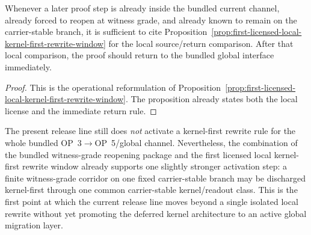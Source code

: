 \begin{corollary}
\label{cor:use-rule-for-the-first-local-kernel-first-rewrite-window}
Whenever a later proof step is already inside the bundled current channel, already forced to reopen at witness grade, and already known to remain on the carrier-stable branch, it is sufficient to cite Proposition~\ref{prop:first-licensed-local-kernel-first-rewrite-window} for the local source/return comparison. After that local comparison, the proof should return to the bundled global interface immediately.
\end{corollary}

\begin{proof}
This is the operational reformulation of Proposition~\ref{prop:first-licensed-local-kernel-first-rewrite-window}. The proposition already states both the local license and the immediate return rule.
\end{proof}


\begin{remark}
\label{rem:status-of-the-first-corridor-level-activation-step}
The present release line still does \emph{not} activate a kernel-first rewrite rule for the whole bundled OP~3$\to$OP~5/global channel. Nevertheless, the combination of the bundled witness-grade reopening package and the first licensed local kernel-first rewrite window already supports one slightly stronger activation step: a finite witness-grade corridor on one fixed carrier-stable branch may be discharged kernel-first through one common carrier-stable kernel/readout class. This is the first point at which the current release line moves beyond a single isolated local rewrite without yet promoting the deferred kernel architecture to an active global migration layer.
\end{remark}

